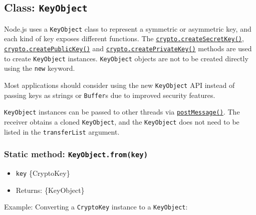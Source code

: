 \subsection{\texorpdfstring{Class:
\texttt{KeyObject}}{Class: KeyObject}}\label{class-keyobject}

Node.js uses a \texttt{KeyObject} class to represent a symmetric or
asymmetric key, and each kind of key exposes different functions. The
\hyperref[cryptocreatesecretkeykey-encoding]{\texttt{crypto.createSecretKey()}},
\hyperref[cryptocreatepublickeykey]{\texttt{crypto.createPublicKey()}}
and
\hyperref[cryptocreateprivatekeykey]{\texttt{crypto.createPrivateKey()}}
methods are used to create \texttt{KeyObject} instances.
\texttt{KeyObject} objects are not to be created directly using the
\texttt{new} keyword.

Most applications should consider using the new \texttt{KeyObject} API
instead of passing keys as strings or \texttt{Buffer}s due to improved
security features.

\texttt{KeyObject} instances can be passed to other threads via
\href{worker_threads.md\#portpostmessagevalue-transferlist}{\texttt{postMessage()}}.
The receiver obtains a cloned \texttt{KeyObject}, and the
\texttt{KeyObject} does not need to be listed in the
\texttt{transferList} argument.

\subsubsection{\texorpdfstring{Static method:
\texttt{KeyObject.from(key)}}{Static method: KeyObject.from(key)}}\label{static-method-keyobject.fromkey}

\begin{itemize}
\tightlist
\item
  \texttt{key} \{CryptoKey\}
\item
  Returns: \{KeyObject\}
\end{itemize}

Example: Converting a \texttt{CryptoKey} instance to a
\texttt{KeyObject}:

